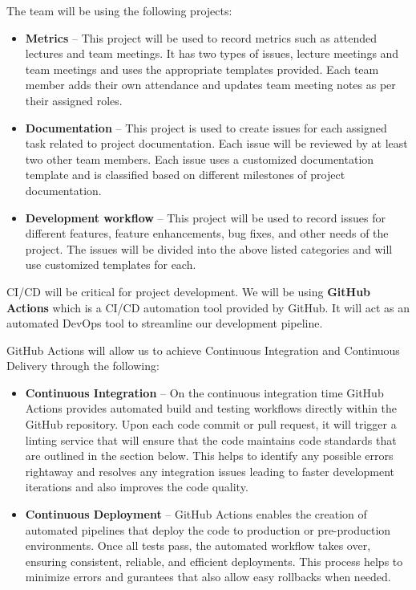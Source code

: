 \documentclass{article}
\begin{document}
The team will be using the following projects:

\begin{itemize}
\item \textbf{Metrics} -- This project will be used to record metrics such as attended lectures and team meetings. It has two types of issues, lecture meetings and team meetings and uses the appropriate templates provided. Each team member adds their own attendance and updates team meeting notes as per their assigned roles.
\item \textbf{Documentation} -- This project is used to create issues for each assigned task related to project documentation. Each issue will be reviewed by at least two other team members. Each issue uses a customized documentation template and is classified based on different milestones of project documentation. 
\item \textbf{Development workflow} -- This project will be used to record issues for different features, feature enhancements, bug fixes, and other needs of the project. The issues will be divided into the above listed categories and will use customized templates for each. 
\end{itemize}

CI/CD will be critical for project development. We will be using \textbf{GitHub Actions} which is a CI/CD automation tool provided by GitHub. It will act as an automated DevOps tool to streamline our development pipeline.

GitHub Actions will allow us to achieve Continuous Integration and Continuous Delivery through the following:
\begin{itemize}
  \item \textbf{Continuous Integration} -- On the continuous integration time GitHub Actions provides automated build and testing workflows directly within the GitHub repository. Upon each code commit or pull request, it will trigger a linting service that will ensure that the code maintains code standards that are outlined in the section below. This helps to identify any possible errors rightaway and resolves any integration issues leading to faster development iterations and also improves the code quality.
  \item \textbf{Continuous Deployment} -- GitHub Actions enables the creation of automated pipelines that deploy the code to production or pre-production environments. Once all tests pass, the automated workflow takes over, ensuring consistent, reliable, and efficient deployments. This process helps to minimize errors and gurantees that also allow easy rollbacks when needed. 
\end{itemize}
\end{document}
